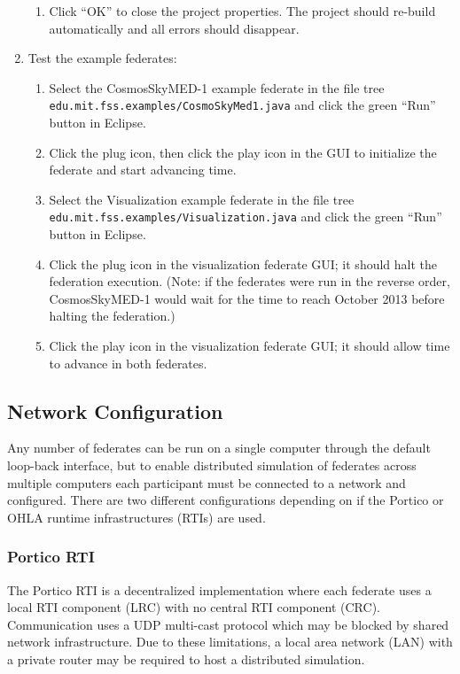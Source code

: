 \documentclass[]{article}
\begin{document}
\begin{enumerate}
\begin{enumerate}
\item Click ``OK'' to close the project properties. The project should re-build automatically and all errors should disappear.
\end{enumerate}
\item Test the example federates:
\begin{enumerate}
\item Select the CosmosSkyMED-1 example federate in the file tree \\ \texttt{edu.mit.fss.examples/CosmoSkyMed1.java} and click the green ``Run'' button in Eclipse.
\item Click the plug icon, then click the play icon in the GUI to initialize the federate and start advancing time.
\item Select the Visualization example federate in the file tree \\ \texttt{edu.mit.fss.examples/Visualization.java} and click the green ``Run'' button in Eclipse.
\item Click the plug icon in the visualization federate GUI; it should halt the federation execution. (Note: if the federates were run in the reverse order, CosmosSkyMED-1 would wait for the time to reach October 2013 before halting the federation.)
\item Click the play icon in the visualization federate GUI; it should allow time to advance in both federates.
\end{enumerate}
\end{enumerate}

\subsection{Network Configuration}

Any number of federates can be run on a single computer through the default loop-back interface, but to enable distributed simulation of federates across multiple computers each participant must be connected to a network and configured. There are two different configurations depending on if the Portico or OHLA runtime infrastructures (RTIs) are used.

\subsubsection{Portico RTI}

The Portico RTI is a decentralized implementation where each federate uses a local RTI component (LRC) with no central RTI component (CRC). Communication uses a UDP multi-cast protocol which may be blocked by shared network infrastructure. Due to these limitations, a local area network (LAN) with a private router may be required to host a distributed simulation.
\end{document}
